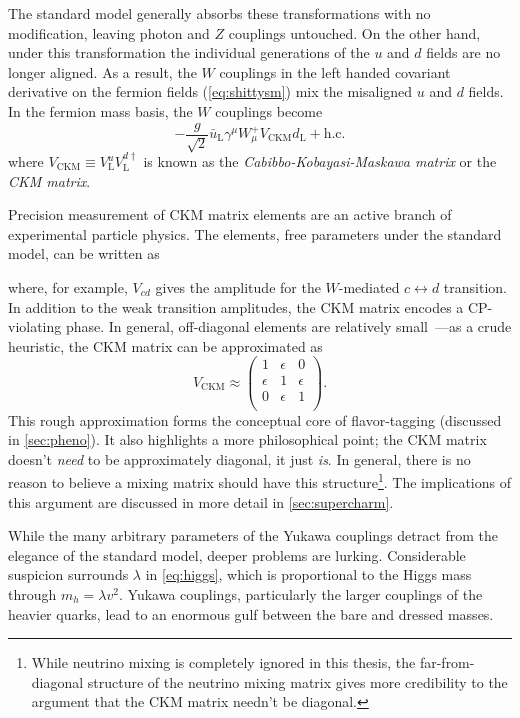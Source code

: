 The standard model generally absorbs these transformations with no modification, leaving photon and $Z$ couplings untouched.
On the other hand, under this transformation the individual generations of the $u$ and $d$ fields are no longer aligned. As a result, the $W$ couplings in the left handed covariant derivative on the fermion fields (\cref{eq:shittysm}) mix the misaligned $u$ and $d$ fields.
In the fermion mass basis, the $W$ couplings become
\begin{equation}
  - \frac{g}{\sqrt{2}} \bar{u}_{\mathrm{L}} \gamma^\mu W^+_\mu V_{\text{CKM}} d_{\mathrm{L}} + \text{h.c.}
\end{equation}
where $V_{\text{CKM}} \equiv V^u_{\mathrm{L}}V^{d\dag}_{\mathrm{L}}$ is known as the \emph{Cabibbo-Kobayasi-Maskawa matrix} or the \emph{CKM matrix}.

Precision measurement of CKM matrix elements are an active branch of experimental particle physics. The elements, free parameters under the standard model, can be written as

where, for example, $V_{cd}$ gives the amplitude for the $W$-mediated $c \leftrightarrow d$ transition. In addition to the weak transition amplitudes, the CKM matrix encodes a CP-violating phase.
In general, off-diagonal elements are relatively small~\cite{pdg2014}---as a crude heuristic, the CKM matrix can be approximated as
\begin{equation}
V_{\text{CKM}} \approx
\begin{pmatrix}
  1 & \epsilon & 0 \\
  \epsilon & 1 & \epsilon \\
  0 & \epsilon & 1 \\
\end{pmatrix}.
\end{equation}
This rough approximation forms the conceptual core of flavor-tagging (discussed in \cref{sec:pheno}). It also highlights a more philosophical point; the CKM matrix doesn't \emph{need} to be approximately diagonal, it just \emph{is}. In general, there is no reason to believe a mixing matrix should have this structure\footnote{While neutrino mixing is completely ignored in this thesis, the far-from-diagonal structure of the neutrino mixing matrix gives more credibility to the argument that the CKM matrix needn't be diagonal.}. The implications of this argument are discussed in more detail in \cref{sec:supercharm}.


While the many arbitrary parameters of the Yukawa couplings detract from the elegance of the standard model, deeper problems are lurking. Considerable suspicion surrounds $\lambda$ in \cref{eq:higgs}, which is proportional to the Higgs mass through $m_{h} = \lambda v^2$. Yukawa couplings, particularly the larger couplings of the heavier quarks, lead to an enormous gulf between the bare and dressed masses.

